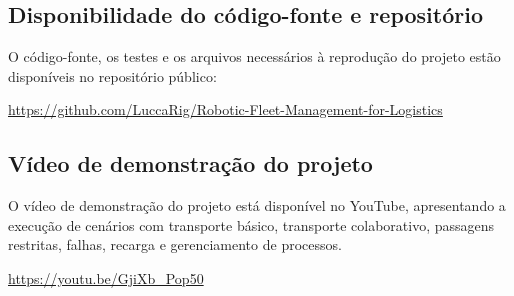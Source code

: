 \documentclass[12pt,a4paper]{article}
\begin{document}
\subsection{Disponibilidade do código-fonte e repositório}
O código-fonte, os testes e os arquivos necessários à reprodução do projeto
estão disponíveis no repositório público:

\begin{center}
    \url{https://github.com/LuccaRig/Robotic-Fleet-Management-for-Logistics}
\end{center}


\subsection{Vídeo de demonstração do projeto}
O vídeo de demonstração do projeto está disponível no YouTube, apresentando a
execução de cenários com transporte básico, transporte colaborativo, passagens
restritas, falhas, recarga e gerenciamento de processos.

\begin{center}
    \url{https://youtu.be/GjiXb_Pop50}
\end{center}
\end{document}
